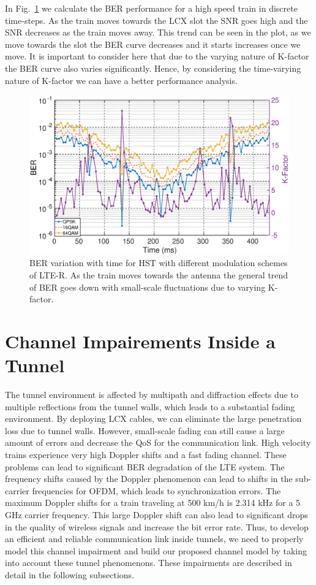 In Fig.~\ref{kfactorber} we calculate the BER performance for a high speed train in discrete time-steps. As the train moves towards
the LCX slot the SNR goes high and the SNR decreases as the train moves away. This trend can be seen in the plot, as we move towards the slot the BER curve decreases and it starts increases once we move. It is important to consider here that due to the varying nature of K-factor the BER curve also varies significantly. Hence, by considering the time-varying nature of K-factor we can have a better performance analysis.

\begin{figure}[!ht]
\label{kfactorber}
\centering
\includegraphics[width=\textwidth,keepaspectratio]{images/Gill/lte_figs/kfactorcontinuous.eps} 
\caption{BER variation with time for HST with different modulation schemes of LTE-R. As the train moves towards
the antenna the general trend of BER goes down with small-scale fluctuations due to varying K-factor.}
\end{figure}


\section{Channel Impairements Inside a Tunnel}
The tunnel environment is affected by multipath and diffraction effects due to multiple reflections from the tunnel walls, which leads to a substantial fading environment. By deploying LCX cables, we can eliminate the large penetration loss due to tunnel walls. However, small-scale fading can still cause a large amount of errors and decrease the QoS for the communication link. High velocity trains experience very high Doppler shifts and a fast fading channel. These problems can lead to significant BER degradation of the LTE system. The frequency shifts caused by the Doppler phenomenon can lead to shifts in the sub-carrier frequencies for OFDM, which leads to synchronization errors. The maximum Doppler shifts for a train traveling at 500 km/h is 2.314 kHz for a 5 GHz carrier frequency. This large Doppler shift can also lead to significant drops in the quality of wireless signals and increase the bit error rate. Thus,
to develop an efficient and reliable communication link inside tunnels, we need to properly model this channel impairment and build our proposed channel model by taking into account these tunnel phenomenons. These impairments are described in detail in the following subsections.

